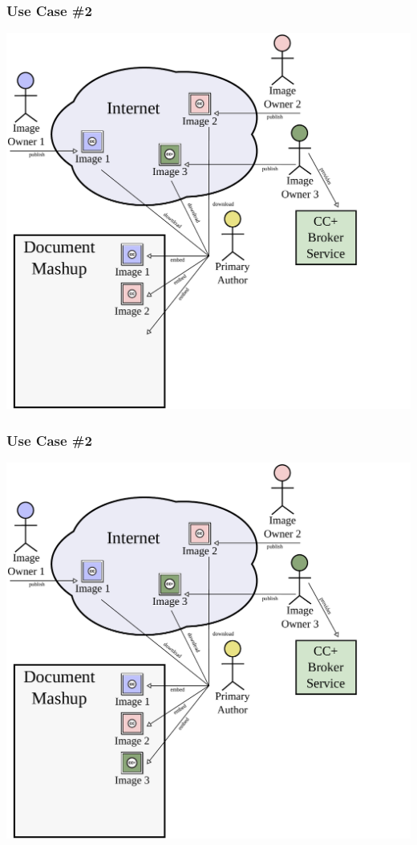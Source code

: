 \documentclass[mathserif,xcolor=dvipsnames,hyperref={bookmarks=true}]{beamer}
\begin{document}
    \begin{frame}[t]
        \frametitle{Use Case \#2}
        \begin{center}
            \includegraphics[width=0.9\textheight]{../resources/usecases/usecase2/usecase2-step22.pdf}
        \end{center}
    \end{frame}
    \begin{frame}[t]
        \frametitle{Use Case \#2}
        \begin{center}
            \includegraphics[width=0.9\textheight]{../resources/usecases/usecase2/usecase2-step23.pdf}
        \end{center}
    \end{frame}
\end{document}
